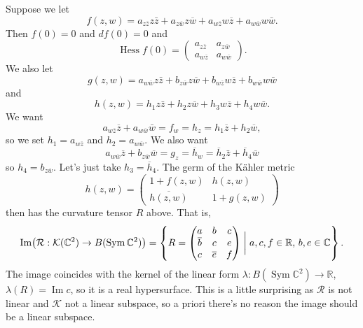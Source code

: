 \documentclass[11pt]{article}
\theoremstyle{definition}
\newcommand{\kk}[1]{\mathbb{#1}}
\newcommand{\cc}[1]{\mathcal{#1}}
\def\ov#1{\overline{#1}}
\DeclareMathOperator{\im}{Im}
\DeclareMathOperator{\Sym}{Sym}
\begin{document}
Suppose we let
$$
f(z,w)
= a_{z \ov z} z \bar z
+ a_{z \ov w} z \ov w
+ a_{w \ov z} w \ov z
+ a_{w \ov w} w \bar w.
$$
Then $f(0) = 0$ and $df(0) = 0$ and
$$
\operatorname{Hess} f(0)
= \begin{pmatrix}
a_{z \ov z} & a_{z \ov w}
\\
a_{w \ov z} & a_{w \ov w}
\end{pmatrix}.
$$
We also let
$$
g(z,w)
= a_{w \ov w} z \bar z
+ b_{z \ov w} z \ov w
+ b_{w \ov z} w \ov z
+ b_{w \ov w} w \bar w
$$
and
$$
h(z,w)
= h_1 z \bar z
+ h_2 z \ov w
+ h_3 w \ov z
+ h_4 w \bar w.
$$
We want
$$
a_{w \ov z} \ov z + a_{w \ov w} \bar w
= f_w = h_z
= h_1 \ov z + h_2 \ov w,
$$
so we set $h_1 = a_{w \ov z}$ and $h_2 = a_{w \ov w}$.
We also want
$$
a_{w \ov w} \ov z + b_{z \ov w} \ov w
= g_z = \ov h_w
= \ov h_2 \bar z + \ov h_4 \ov w
$$
so $h_4 = b_{z \ov w}$.
Let's just take $h_3 = \ov h_4$.
The germ of the K\"ahler metric
$$
h(z,w)
= \begin{pmatrix}
1 + f(z,w) & h(z,w)
\\
\ov{h(z,w)} & 1 + g(z,w)
\end{pmatrix}
$$
then has the curvature tensor $R$ above. That is,
$$
\im\bigl(
\cc R : \cc K(\kk C^2) \to B(\Sym \kk C^2)
\bigr)
= \left\{
R =
\begin{pmatrix}
a & b & c
\\
\ov b & c & e
\\
c & \ov e & f
\end{pmatrix}
\biggm|
\text{$a, c, f \in \kk R$, $b, e \in \kk C$}
\right\}.
$$
The image coincides with the kernel of the linear form
$\lambda : B(\Sym \kk C^2) \to \kk R$, $\lambda(R) = \im c$, so it is a real
hypersurface.
This is a little surprising as $\cc R$ is not linear and $\cc K$ not a linear
subspace, so a priori there's no reason the image should be a linear subspace.
\end{document}
